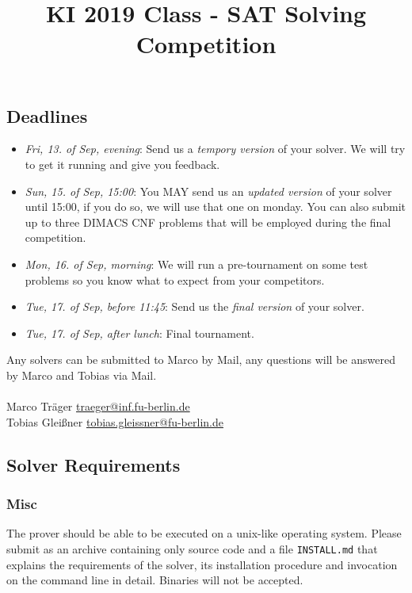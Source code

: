\documentclass[11pt,a4paper,english]{article}
\title{KI 2019 Class - SAT Solving Competition}
\begin{document}
\maketitle

\subsection*{Deadlines}
\begin{itemize}
\item \textit{Fri, 13. of Sep, evening}: Send us a \textit{tempory version} of your solver. We will try to get it running and give you feedback.
\item \textit{Sun, 15. of Sep, 15:00}: You MAY send us an \textit{updated version} of your solver until 15:00, if you do so, we will use that one on monday. You can also submit up to three DIMACS CNF problems that will be employed during the final competition.
\item \textit{Mon, 16. of Sep, morning}: We will run a pre-tournament on some test problems so you know what to expect from your competitors.
\item \textit{Tue, 17. of Sep, before 11:45}: Send us the \textit{final version} of your solver.
\item \textit{Tue, 17. of Sep, after lunch}: Final tournament.
\end{itemize}
Any solvers can be submitted to Marco by Mail, any questions will be answered by Marco and Tobias via Mail.
\\
\\
Marco Träger \url{traeger@inf.fu-berlin.de}
\\
Tobias Gleißner \url{tobias.gleissner@fu-berlin.de}

\subsection*{Solver Requirements}
\subsubsection*{Misc}
The prover should be able to be executed on a unix-like operating system. Please submit as an archive containing only source code and a file
\texttt{INSTALL.md} that explains the requirements of the solver, its installation procedure and invocation on the command line in detail.
Binaries will not be accepted.
\end{document}
